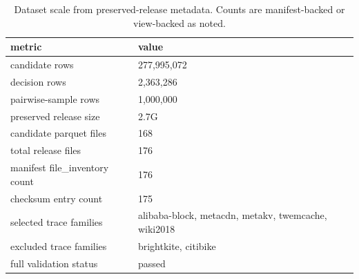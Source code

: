 \begin{table}[H]
  \centering
  \footnotesize
  \caption{Dataset scale from preserved-release metadata. Counts are manifest-backed or view-backed as noted.}
  \label{tab:dataset-scale}
  \begin{tabularx}{\columnwidth}{@{}P{0.43\columnwidth}L@{}}
    \toprule
    metric & value \\
    \midrule
    candidate rows & 277,995,072 \\
    decision rows & 2,363,286 \\
    pairwise-sample rows & 1,000,000 \\
    preserved release size & 2.7G \\
    candidate parquet files & 168 \\
    total release files & 176 \\
    manifest file\_inventory count & 176 \\
    checksum entry count & 175 \\
    selected trace families & alibaba-block, metacdn, metakv, twemcache, wiki2018 \\
    excluded trace families & brightkite, citibike \\
    full validation status & passed \\
    \bottomrule
  \end{tabularx}
\end{table}
